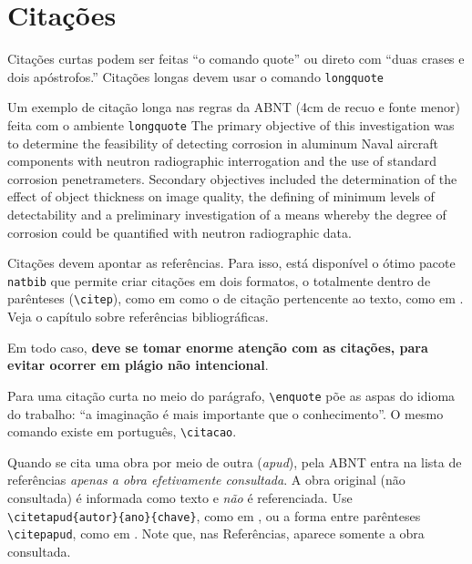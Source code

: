 \documentclass[dsc,pdfa,setavermelha]{ufrj}
\theoremstyle{plain}
\theoremstyle{definition}
\theoremstyle{remark}
\begin{document}
\section{Citações}
\label{sec:citacoes}

 Citações curtas podem ser feitas \enquote{o comando quote} ou direto com ``duas crases e dois apóstrofos.'' Citações longas devem usar o comando \verb*|longquote|

  \begin{longquote}
  Um exemplo de citação longa nas regras da ABNT (4cm de recuo e fonte menor)
  feita com o ambiente  \verb*|longquote| The primary objective of this
  investigation was to determine the feasibility of detecting corrosion in
  aluminum Naval aircraft components with neutron radiographic interrogation
  and the use of standard corrosion penetrameters. Secondary objectives
  included the determination of the effect of object thickness on image quality,
  the defining of minimum levels of detectability and a preliminary investigation
  of a means whereby the degree of corrosion could be quantified with neutron
  radiographic data. \citep{article-example}
  \end{longquote}

  Citações devem apontar as referências. Para isso, está disponível o ótimo pacote \verb*|natbib| que permite criar citações em dois formatos, o totalmente dentro de parênteses (\verb*|\citep|), como em \citep{article-example} como o de citação pertencente ao texto, como em \citet{article-example}. Veja o capítulo sobre referências bibliográficas.

  Em todo caso, \textbf{deve se tomar enorme atenção com as citações, para evitar ocorrer em plágio não intencional}.

  Para uma citação curta no meio do parágrafo, \verb|\enquote| põe as aspas do idioma do trabalho: \enquote{a imaginação é mais importante que o conhecimento}. O mesmo comando existe em português, \verb|\citacao|.

  Quando se cita uma obra por meio de outra (\textit{apud}), pela ABNT entra na lista de referências \emph{apenas a obra efetivamente consultada}. A obra original (não consultada) é informada como texto e \emph{não} é referenciada. Use \verb*|\citetapud{autor}{ano}{chave}|, como em , ou a forma entre parênteses \verb*|\citepapud|, como em . Note que, nas Referências, aparece somente a obra consultada.
\end{document}
